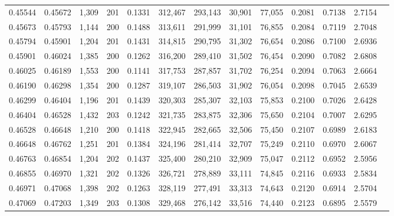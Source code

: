 \begin{tabular}{rrrrrrrrrrrrr}
0.45544 & 0.45672 & 1,309 & 201 &                                     0.1331 & 312,467 & 293,143 &  30,901 &  77,055 & 0.2081 & 0.7138 & 2.7154 \\
0.45673 & 0.45793 & 1,144 & 200 &                                     0.1488 & 313,611 & 291,999 &  31,101 &  76,855 & 0.2084 & 0.7119 & 2.7048 \\
0.45794 & 0.45901 & 1,204 & 201 &                                     0.1431 & 314,815 & 290,795 &  31,302 &  76,654 & 0.2086 & 0.7100 & 2.6936 \\
0.45901 & 0.46024 & 1,385 & 200 &                                     0.1262 & 316,200 & 289,410 &  31,502 &  76,454 & 0.2090 & 0.7082 & 2.6808 \\
0.46025 & 0.46189 & 1,553 & 200 &                                     0.1141 & 317,753 & 287,857 &  31,702 &  76,254 & 0.2094 & 0.7063 & 2.6664 \\
0.46190 & 0.46298 & 1,354 & 200 &                                     0.1287 & 319,107 & 286,503 &  31,902 &  76,054 & 0.2098 & 0.7045 & 2.6539 \\
0.46299 & 0.46404 & 1,196 & 201 &                                     0.1439 & 320,303 & 285,307 &  32,103 &  75,853 & 0.2100 & 0.7026 & 2.6428 \\
0.46404 & 0.46528 & 1,432 & 203 &                                     0.1242 & 321,735 & 283,875 &  32,306 &  75,650 & 0.2104 & 0.7007 & 2.6295 \\
0.46528 & 0.46648 & 1,210 & 200 &                                     0.1418 & 322,945 & 282,665 &  32,506 &  75,450 & 0.2107 & 0.6989 & 2.6183 \\
0.46648 & 0.46762 & 1,251 & 201 &                                     0.1384 & 324,196 & 281,414 &  32,707 &  75,249 & 0.2110 & 0.6970 & 2.6067 \\
0.46763 & 0.46854 & 1,204 & 202 &                                     0.1437 & 325,400 & 280,210 &  32,909 &  75,047 & 0.2112 & 0.6952 & 2.5956 \\
0.46855 & 0.46970 & 1,321 & 202 &                                     0.1326 & 326,721 & 278,889 &  33,111 &  74,845 & 0.2116 & 0.6933 & 2.5834 \\
0.46971 & 0.47068 & 1,398 & 202 &                                     0.1263 & 328,119 & 277,491 &  33,313 &  74,643 & 0.2120 & 0.6914 & 2.5704 \\
0.47069 & 0.47203 & 1,349 & 203 &                                     0.1308 & 329,468 & 276,142 &  33,516 &  74,440 & 0.2123 & 0.6895 & 2.5579 \\

\end{tabular}
